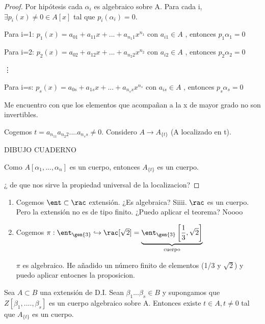 \begin{proof}
Por hipótesis cada $\alpha_i$ es algebraico sobre A. Para cada i, $\exists p_i(x) \neq 0 \in A[x]$ tal que $p_i(\alpha_i)=0$.

Para i=1: $p_1(x)=a_{01}+a_{11}x+...+a_{n_1 1}x^{n_1}$ con $a_{i1}\in A$ , entonces $p_1{\alpha_1}=0$

Para i=2: $p_2(x)=a_{02}+a_{12}x+...+a_{n_2 2}x^{n_2}$ con $a_{i2}\in A$ , entonces $p_2{\alpha_2}=0$

\vdots

Para i=s: $p_s(x)=a_{0s}+a_{1s}x+...+a_{n_s s}x^{n_s}$ con $a_{is}\in A$ , entonces $p_s{\alpha_s}=0$

Me encuentro con que los elementos que acompañan a la x de mayor grado no son invertibles.

Cogemos $t=a_{n_11} a_{n_2 2}....a_{n_s s}\neq 0$. Considero $A \rightarrow A_{\{t\}}$ (A localizado en t).

DIBUJO CUADERNO

Como $A[\alpha_1,...,\alpha_n]$ es un cuerpo, entonces $A_{\{t\}}$ es un cuerpo.

¿ de que nos sirve la propiedad universal de la localizacion?
\end{proof}

\begin{example}
	\begin{enumerate}
		\item Cogemos $\ent \subset \rac$ extensión. ¿Es algebraica? Siiii. $\rac$ es un cuerpo. Pero la extensión no es de tipo finito. ¿Puedo aplicar el teorema?  Noooo
		\item Cogemos $\pi: \ent_{\gen{3}} \hookrightarrow \rac[\sqrt{2}]=
		\underbrace{\ent_{\gen{3}}\left[\frac{1}{3}, \sqrt{2}\right]}_{\text{cuerpo}}$

		$\pi$ es algebraico. He añadido un número finito de elementos (1/3 y $\sqrt{2}$) y puedo aplicar entocnes la proposicion.
	\end{enumerate}
\end{example}

\begin{prop}
	Sea $A \subset B$ una extensión de D.I. Sean $\beta_1...\beta_s \in B$ y supongamos que $Z[\beta_1,....,\beta_s]$ es un cuerpo algebraico sobre A. Entonces existe $t \in A, t \neq 0$ tal que $A_{\{t\}}$ es un cuerpo.
\end{prop}


